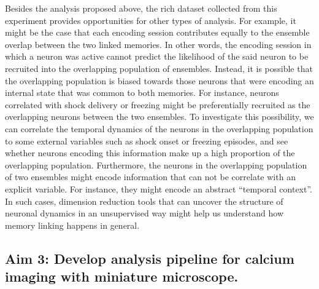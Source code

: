 \documentclass[master.tex]{subfiles}
\begin{document}
Besides the analysis proposed above, the rich dataset collected from this
experiment provides opportunities for other types of analysis. For example, it
might be the case that each encoding session contributes equally to the ensemble
overlap between the two linked memories. In other words, the encoding session in
which a neuron was active cannot predict the likelihood of the said neuron to be
recruited into the overlapping population of ensembles. Instead, it is possible
that the overlapping population is biased towards those neurons that were
encoding an internal state that was common to both memories. For instance,
neurons correlated with shock delivery or freezing might be preferentially
recruited as the overlapping neurons between the two ensembles. To investigate
this possibility, we can correlate the temporal dynamics of the neurons in the
overlapping population to some external variables such as shock onset or
freezing episodes, and see whether neurons encoding this information make up a
high proportion of the overlapping population. Furthermore, the neurons in the
overlapping population of two ensembles might encode information that can not be
correlate with an explicit variable. For instance, they might encode an abstract
``temporal context''. In such cases, dimension reduction tools that can uncover
the structure of neuronal dynamics in an unsupervised way might help us
understand how memory linking happens in general.

\subsection*{Aim 3: Develop analysis pipeline for calcium imaging with miniature
  microscope.}
\end{document}
